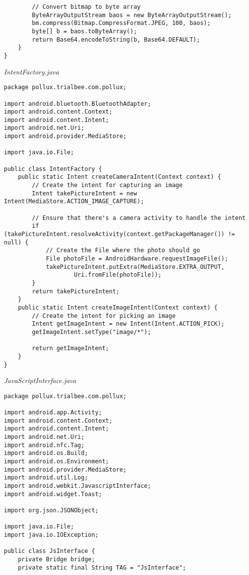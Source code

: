 \begin{appendices}
\begin{lstlisting}
        // Convert bitmap to byte array
        ByteArrayOutputStream baos = new ByteArrayOutputStream();
        bm.compress(Bitmap.CompressFormat.JPEG, 100, baos);
        byte[] b = baos.toByteArray();
        return Base64.encodeToString(b, Base64.DEFAULT);
    }
}
\end{lstlisting}

\emph{IntentFactory.java}
\begin{lstlisting}
package pollux.trialbee.com.pollux;

import android.bluetooth.BluetoothAdapter;
import android.content.Context;
import android.content.Intent;
import android.net.Uri;
import android.provider.MediaStore;

import java.io.File;

public class IntentFactory {
    public static Intent createCameraIntent(Context context) {
        // Create the intent for capturing an image
        Intent takePictureIntent = new Intent(MediaStore.ACTION_IMAGE_CAPTURE);

        // Ensure that there's a camera activity to handle the intent
        if (takePictureIntent.resolveActivity(context.getPackageManager()) != null) {
            // Create the File where the photo should go
            File photoFile = AndroidHardware.requestImageFile();
            takePictureIntent.putExtra(MediaStore.EXTRA_OUTPUT,
                    Uri.fromFile(photoFile));
        }
        return takePictureIntent;
    }
    public static Intent createImageIntent(Context context) {
        // Create the intent for picking an image
        Intent getImageIntent = new Intent(Intent.ACTION_PICK);
        getImageIntent.setType("image/*");

        return getImageIntent;
    }
}
\end{lstlisting}
\emph{JavaScriptInterface.java}
\begin{lstlisting}
package pollux.trialbee.com.pollux;

import android.app.Activity;
import android.content.Context;
import android.content.Intent;
import android.net.Uri;
import android.nfc.Tag;
import android.os.Build;
import android.os.Environment;
import android.provider.MediaStore;
import android.util.Log;
import android.webkit.JavascriptInterface;
import android.widget.Toast;

import org.json.JSONObject;

import java.io.File;
import java.io.IOException;

public class JsInterface {  
    private Bridge bridge;
    private static final String TAG = "JsInterface";


\end{lstlisting}
\end{appendices}
